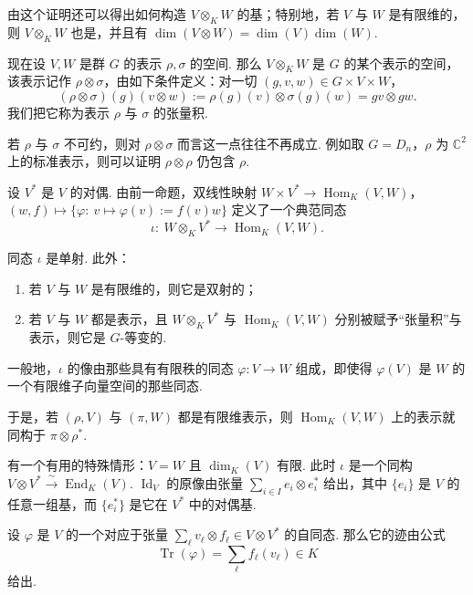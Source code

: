 由这个证明还可以得出如何构造 $V\otimes_K W$ 的基；特别地，若 $V$ 与 $W$ 是有限维的，则 $V\otimes_K W$ 也是，并且有 $\dim(V\otimes W)=\dim(V)\dim(W)$.

现在设 $V,W$ 是群 $G$ 的表示 $\rho,\sigma$ 的空间. 那么 $V\otimes_K W$ 是 $G$ 的某个表示的空间，该表示记作 $\rho\otimes\sigma$，由如下条件定义：对一切 $(g,v,w)\in G\times V\times W$，
\[
(\rho\otimes\sigma)(g)(v\otimes w):=\rho(g)(v)\otimes\sigma(g)(w)=gv\otimes gw.
\]
我们把它称为表示 $\rho$ 与 $\sigma$ 的张量积.

\begin{example}\label{ex:fg-4-1-20}
若 $\rho$ 与 $\sigma$ 不可约，则对 $\rho\otimes\sigma$ 而言这一点往往不再成立. 例如取 $G=D_n$，$\rho$ 为 $\mathbb{C}^2$ 上的标准表示，则可以证明 $\rho\otimes\rho$ 仍包含 $\rho$.
\end{example}

\begin{numpara}\label{np:fg-4-1-21}
设 $V^*$ 是 $V$ 的对偶. 由前一命题，双线性映射 $W\times V^*\longrightarrow\operatorname{Hom}_K(V,W)$，$(w,f)\longmapsto\{\varphi:\ v\longmapsto\varphi(v):=f(v)w\}$ 定义了一个典范同态
\[
\iota:\ W\otimes_K V^*\longrightarrow\operatorname{Hom}_K(V,W).
\]
\end{numpara}

\begin{lemma}\label{lemma:fg-4-1-22}
同态 $\iota$ 是单射. 此外：
\begin{enumerate}[label=\roman*)]
\item 若 $V$ 与 $W$ 是有限维的，则它是双射的；
\item 若 $V$ 与 $W$ 都是表示，且 $W\otimes_K V^*$ 与 $\operatorname{Hom}_K(V,W)$ 分别被赋予``张量积''与表示，则它是 $G$-等变的.
\end{enumerate}
\end{lemma}

\begin{remark*}
一般地，$\iota$ 的像由那些具有有限秩的同态 $\varphi:V\longrightarrow W$ 组成，即使得 $\varphi(V)$ 是 $W$ 的一个有限维子向量空间的那些同态.
\end{remark*}

于是，若 $(\rho,V)$ 与 $(\pi,W)$ 都是有限维表示，则 $\operatorname{Hom}_K(V,W)$ 上的表示就同构于 $\pi\otimes\rho^*$.

有一个有用的特殊情形：$V=W$ 且 $\dim_K(V)$ 有限. 此时 $\iota$ 是一个同构 $V\otimes V^*\xrightarrow{\ \sim\ }\operatorname{End}_K(V)$. $\operatorname{Id}_V$ 的原像由张量 $\sum_{i\in I}e_i\otimes e_i^*$ 给出，其中 $\{e_i\}$ 是 $V$ 的任意一组基，而 $\{e_i^*\}$ 是它在 $V^*$ 中的对偶基.

\begin{lemma}\label{lemma:fg-4-1-23}
设 $\varphi$ 是 $V$ 的一个对应于张量 $\sum_\ell v_\ell\otimes f_\ell\in V\otimes V^*$ 的自同态. 那么它的迹由公式
\[
\operatorname{Tr}(\varphi)=\sum_\ell f_\ell(v_\ell)\in K
\]
给出.
\end{lemma}
